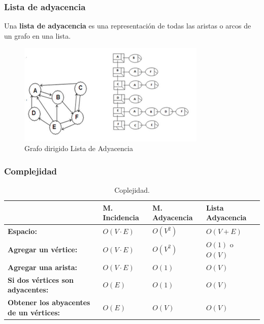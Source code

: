 \documentclass[../main.tex]{subfiles}
\begin{document}
            \newpage
        
        \subsubsection{Lista de adyacencia}
            Una \textbf{lista de adyacencia} es una representación de todas las aristas o arcos de un grafo en una lista. 
             \begin{figure}[ht]
                \centering
                \includegraphics[width=0.8\textwidth]{images/grafos/grafo_lista_adyacencia.jpg}
                \caption{Grafo dirigido Lista de Adyacencia} 
            \end{figure}
        \subsubsection{Complejidad}
    
            \begin{table}[ht]
                \centering
                \begin{tabular}{|l|l|l|l|}
                \hline
                    & M. Incidencia & M. Adyacencia & Lista Adyacencia\\ \hline
                    \textbf{Espacio:} & $O(V \cdot E)$ & $O(V^2)$ & $O(V + E)$\\ \hline
                    \textbf{Agregar un vértice:}  & $O(V \cdot E)$ & $O(V^2)$ & $O(1)$ o $O(V)$\\ \hline
                    \textbf{Agregar una arista:} & $O(V \cdot E)$ & $O(1)$ & $O(V)$ \\ \hline
                    \textbf{Si dos vértices son adyacentes:} & $O(E)$ & $O(1)$ & $O(V)$\\ \hline
                    \textbf{Obtener los abyacentes de un vértices:} & $O(E)$ & $O(V)$ & $O(V)$\\ \hline
                \end{tabular}
                \caption[short]{Coplejidad.}
            \end{table}
\end{document}
